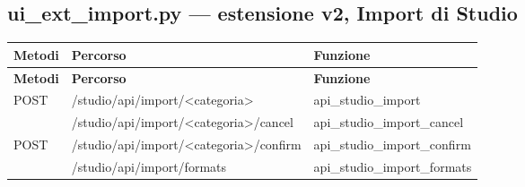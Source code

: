 \subsection{ui\_ext\_import.py --- estensione v2, Import di Studio}
\begin{longtable}{@{}L{17mm}L{74mm}L{45mm}@{}}
\toprule
\textbf{Metodi} & \textbf{Percorso} & \textbf{Funzione} \\
\midrule\endfirsthead
\toprule
\textbf{Metodi} & \textbf{Percorso} & \textbf{Funzione} \\
\midrule\endhead
{\scriptsize\sffamily POST} & {\ttfamily\scriptsize /\allowbreak studio/\allowbreak api/\allowbreak import/\allowbreak <categoria>} & {\ttfamily\scriptsize api\_\allowbreak{}studio\_\allowbreak{}import} \\
 & {\ttfamily\scriptsize /\allowbreak studio/\allowbreak api/\allowbreak import/\allowbreak <categoria>/\allowbreak cancel} & {\ttfamily\scriptsize api\_\allowbreak{}studio\_\allowbreak{}import\_\allowbreak{}cancel} \\
{\scriptsize\sffamily POST} & {\ttfamily\scriptsize /\allowbreak studio/\allowbreak api/\allowbreak import/\allowbreak <categoria>/\allowbreak confirm} & {\ttfamily\scriptsize api\_\allowbreak{}studio\_\allowbreak{}import\_\allowbreak{}confirm} \\
 & {\ttfamily\scriptsize /\allowbreak studio/\allowbreak api/\allowbreak import/\allowbreak formats} & {\ttfamily\scriptsize api\_\allowbreak{}studio\_\allowbreak{}import\_\allowbreak{}formats} \\
\bottomrule
\end{longtable}

